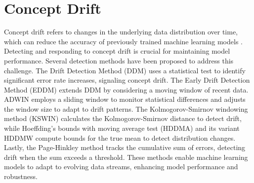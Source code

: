 %
%
\section{Concept Drift}
\label{sec:3_1_concept_drift}
Concept drift refers to changes in the underlying data distribution over time, which can reduce the accuracy of previously trained machine learning models \cite{baena2006early, madkour2023historical, tan2022information}. Detecting and responding to concept drift is crucial for maintaining model performance. Several detection methods have been proposed to address this challenge. The Drift Detection Method (DDM) \cite{gama2004learning, bifet2009new} uses a statistical test to identify significant error rate increases, signaling concept drift. The Early Drift Detection Method (EDDM) \cite{gama2004learning, adams2023explainable} extends DDM by considering a moving window of recent data. ADWIN \cite{gama2004learning, adams2023explainable} employs a sliding window to monitor statistical differences and adjusts the window size to adapt to drift patterns. The Kolmogorov-Smirnov windowing method (KSWIN) \cite{adams2023explainable} calculates the Kolmogorov-Smirnov distance to detect drift, while Hoeffding's bounds with moving average test (HDDMA) and its variant HDDMW \cite{gama2004learning, bifet2009new} compute bounds for the true mean to detect distribution changes. Lastly, the Page-Hinkley method \cite{page1954continuous} tracks the cumulative sum of errors, detecting drift when the sum exceeds a threshold. These methods enable machine learning models to adapt to evolving data streams, enhancing model performance and robustness.
